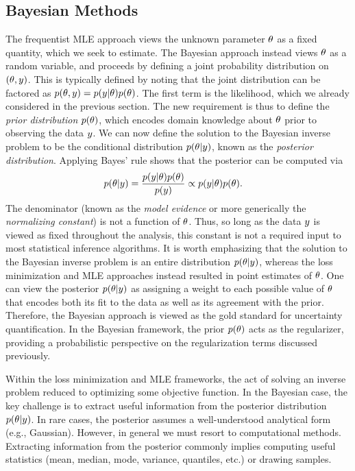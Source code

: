\documentclass[12pt]{article}
\begin{document}
\subsection{Bayesian Methods}
The frequentist MLE approach views the unknown parameter $\theta$ as a fixed quantity, which we seek to estimate.
The Bayesian approach instead views $\theta$ as a random variable, and proceeds by defining a joint probability 
distribution on $(\theta, y)$. This is typically defined by noting that the joint distribution can be 
factored as $p(\theta, y) = p(y | \theta)p(\theta)$. The first term is the likelihood, which we already considered in 
the previous section. The new requirement is thus to define the \textit{prior distribution} $p(\theta)$, which encodes
domain knowledge about $\theta$ prior to observing the data $y$. We can now define the solution to the Bayesian 
inverse problem to be the conditional distribution $p(\theta | y)$, known as the \textit{posterior distribution}. 
Applying Bayes' rule shows that the posterior can be computed via 
\begin{align}
p(\theta | y) &= \frac{p(y | \theta) p(\theta)}{p(y)} \propto p(y | \theta) p(\theta). 
\end{align}
The denominator (known as the \textit{model evidence} or more generically the \textit{normalizing constant}) is 
not a function of $\theta$. Thus, so long as the data $y$ is viewed as fixed throughout the analysis, this constant 
is not a required input to most statistical inference algorithms. It is worth emphasizing that the solution to the Bayesian inverse problem 
is an entire distribution $p(\theta | y)$, whereas the loss minimization and MLE approaches instead resulted in point 
estimates of $\theta$. One can view the posterior $p(\theta | y)$ as assigning a weight to each possible value of 
$\theta$ that encodes both its fit to the data as well as its agreement with the prior.  
Therefore, the Bayesian approach is viewed as the gold standard for uncertainty quantification. In the Bayesian framework, 
the prior $p(\theta)$ acts as the regularizer, providing a probabilistic perspective on the regularization terms discussed previously. 

Within the loss minimization and MLE frameworks, the act of solving an inverse problem reduced to optimizing some 
objective function. In the Bayesian case, the key challenge is to extract useful information from the posterior distribution 
$p(\theta | y)$. In rare cases, the posterior assumes a well-understood analytical form (e.g., Gaussian). However, in 
general we must resort to computational methods. Extracting information from the posterior commonly implies
computing useful statistics (mean, median, mode, variance, quantiles, etc.) or drawing samples. 
\end{document}

